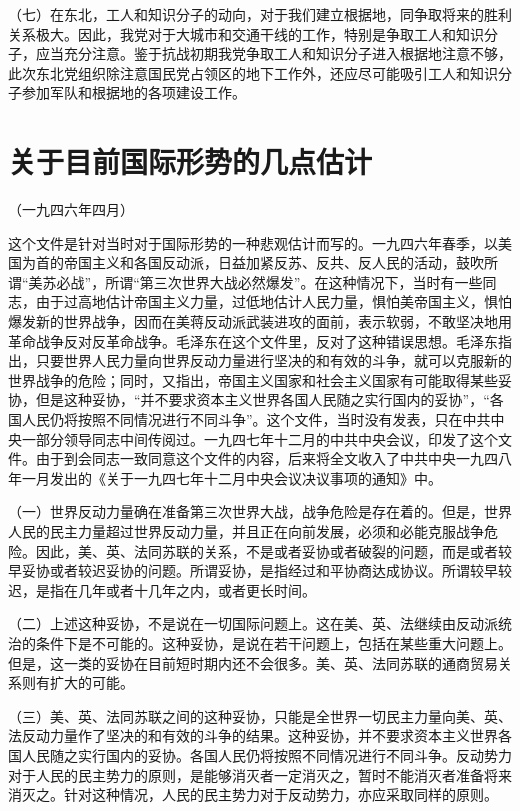 \documentclass[UTF-8, a5paper, 12pt]{ctexart}
\begin{document}
（七）在东北，工人和知识分子的动向，对于我们建立根据地，同争取将来的胜利关系极大。因此，我党对于大城市和交通干线的工作，特别是争取工人和知识分子，应当充分注意。鉴于抗战初期我党争取工人和知识分子进入根据地注意不够，此次东北党组织除注意国民党占领区的地下工作外，还应尽可能吸引工人和知识分子参加军队和根据地的各项建设工作。


\section{关于目前国际形势的几点估计}

（一九四六年四月）

这个文件是针对当时对于国际形势的一种悲观估计而写的。一九四六年春季，以美国为首的帝国主义和各国反动派，日益加紧反苏、反共、反人民的活动，鼓吹所谓“美苏必战”，所谓“第三次世界大战必然爆发”。在这种情况下，当时有一些同志，由于过高地估计帝国主义力量，过低地估计人民力量，惧怕美帝国主义，惧怕爆发新的世界战争，因而在美蒋反动派武装进攻的面前，表示软弱，不敢坚决地用革命战争反对反革命战争。毛泽东在这个文件里，反对了这种错误思想。毛泽东指出，只要世界人民力量向世界反动力量进行坚决的和有效的斗争，就可以克服新的世界战争的危险；同时，又指出，帝国主义国家和社会主义国家有可能取得某些妥协，但是这种妥协，“并不要求资本主义世界各国人民随之实行国内的妥协”，“各国人民仍将按照不同情况进行不同斗争”。这个文件，当时没有发表，只在中共中央一部分领导同志中间传阅过。一九四七年十二月的中共中央会议，印发了这个文件。由于到会同志一致同意这个文件的内容，后来将全文收入了中共中央一九四八年一月发出的《关于一九四七年十二月中央会议决议事项的通知》中。

（一）世界反动力量确在准备第三次世界大战，战争危险是存在着的。但是，世界人民的民主力量超过世界反动力量，并且正在向前发展，必须和必能克服战争危险。因此，美、英、法同苏联的关系，不是或者妥协或者破裂的问题，而是或者较早妥协或者较迟妥协的问题。所谓妥协，是指经过和平协商达成协议。所谓较早较迟，是指在几年或者十几年之内，或者更长时间。

（二）上述这种妥协，不是说在一切国际问题上。这在美、英、法继续由反动派统治的条件下是不可能的。这种妥协，是说在若干问题上，包括在某些重大问题上。但是，这一类的妥协在目前短时期内还不会很多。美、英、法同苏联的通商贸易关系则有扩大的可能。

（三）美、英、法同苏联之间的这种妥协，只能是全世界一切民主力量向美、英、法反动力量作了坚决的和有效的斗争的结果。这种妥协，并不要求资本主义世界各国人民随之实行国内的妥协。各国人民仍将按照不同情况进行不同斗争。反动势力对于人民的民主势力的原则，是能够消灭者一定消灭之，暂时不能消灭者准备将来消灭之。针对这种情况，人民的民主势力对于反动势力，亦应采取同样的原则。 
\end{document}
